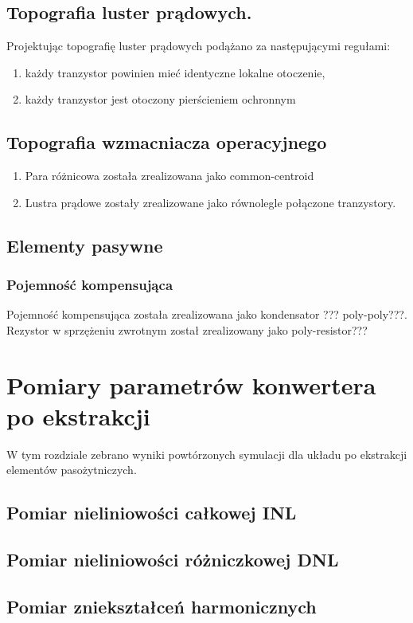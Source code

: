 \documentclass[10pt,a4paper,twoside]{report}
\theoremstyle{definition}
\theoremstyle{definition}
\theoremstyle{definition}
\theoremstyle{definition}
\theoremstyle{definition}
\begin{document}
{{{{{	\section{Topografia luster prądowych.}
	{	Projektując topografię luster prądowych podążano za następującymi regułami:
		\begin{enumerate}
			\item każdy tranzystor powinien mieć identyczne lokalne otoczenie,
			\item każdy tranzystor jest otoczony pierścieniem ochronnym
		\end{enumerate}
	}
	\section{Topografia wzmacniacza operacyjnego}
	{	\begin{enumerate}
			\item Para różnicowa została zrealizowana jako common-centroid
			\item Lustra prądowe zostały zrealizowane jako równolegle połączone tranzystory.
	\end{enumerate}}
	\section{Elementy pasywne}
	\subsection{Pojemność kompensująca}
	{	Pojemność kompensująca została zrealizowana jako kondensator ??? poly-poly???.}
	{	Rezystor w sprzężeniu zwrotnym został zrealizowany jako poly-resistor???}
	
	\chapter{Pomiary parametrów konwertera po ekstrakcji}
	{	W tym rozdziale zebrano wyniki powtórzonych symulacji dla układu po ekstrakcji elementów pasożytniczych.}
	\section{Pomiar nieliniowości całkowej INL}
	\section{Pomiar nieliniowości różniczkowej DNL}
	\section{Pomiar zniekształceń harmonicznych}
}}}}}
\end{document}
